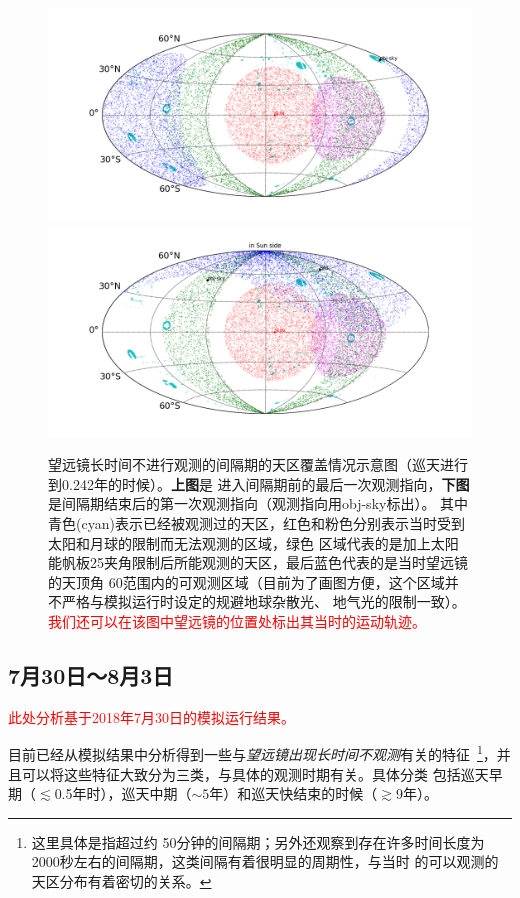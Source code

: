 \documentclass[a4paper,11pt]{ctexart}
\newcommand{\RT}[1]{\textcolor{red}{#1}}
\begin{document}
\begin{figure}[h!]
\centering
\includegraphics[width=\textwidth]{figures/xxx_1_1.png}
\includegraphics[width=\textwidth]{figures/xxx_1_0.png}
\caption{望远镜长时间不进行观测的间隔期的天区覆盖情况示意图（巡天进行到0.242年的时候）。\textbf{上图}是
进入间隔期前的最后一次观测指向，\textbf{下图}是间隔期结束后的第一次观测指向（观测指向用obj-sky标出）。
其中青色(cyan)表示已经被观测过的天区，红色和粉色分别表示当时受到太阳和月球的限制而无法观测的区域，绿色
区域代表的是加上太阳能帆板25\textdegree 夹角限制后所能观测的天区，最后蓝色代表的是当时望远镜的天顶角
60\textdegree 范围内的可观测区域（目前为了画图方便，这个区域并不严格与模拟运行时设定的规避地球杂散光、
地气光的限制一致）。\RT{我们还可以在该图中望远镜的位置处标出其当时的运动轨迹。}}
\label{fig:unobserving_debug}
\end{figure}

\subsection{7月30日～8月3日}
\RT{此处分析基于2018年7月30日的模拟运行结果。}

目前已经从模拟结果中分析得到一些与\textit{望远镜出现长时间不观测}有关的特征~\footnote{这里具体是指超过约
50分钟的间隔期；另外还观察到存在许多时间长度为2000秒左右的间隔期，这类间隔有着很明显的周期性，与当时
的可以观测的天区分布有着密切的关系。}，并且可以将这些特征大致分为三类，与具体的观测时期有关。具体分类
包括巡天早期（$\lesssim$0.5年时），巡天中期（$\sim 5$年）和巡天快结束的时候（$\gtrsim$9年）。
\end{document}
